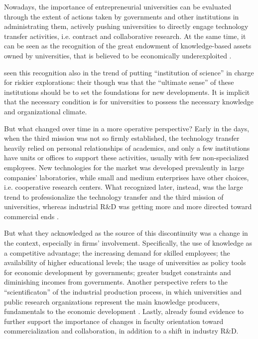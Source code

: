 Nowadays, the importance of entrepreneurial universities can be evaluated through the extent of actions taken by governments and other institutions in administrating them, actively pushing universities to directly engage technology transfer activities, i.e. contract and collaborative research. At the same time, it can be seen as the recognition of the great endowment of knowledge-based assets owned by universities, that is believed to be economically underexploited \citep{Tijssen2006}. 

\citet{Balconi2006} seen this recognition also in the trend of putting \enquote{institution of science} in charge for riskier explorations: their though was that the \enquote{ultimate sense} of these institutions should be to set the foundations for new developments. It is implicit that the necessary condition is for universities to possess the necessary knowledge and organizational climate.

But what changed over time in a more operative perspective? Early in the days, when the third mission was not so firmly established, the technology transfer heavily relied on personal relationships of academics, and only a few institutions have units or offices to support these activities, usually with few non-specialized employees. New technologies for the market was developed prevalently in large companies' laboratories, while small and medium enterprises have other choices, i.e. cooperative research centers. What \citet{Geuna2009} recognized later, instead, was the large trend to professionalize the technology transfer and the third mission of universities, whereas industrial R\&D was getting more and more directed toward commercial ends \citep{Fritsch2007}.

But what they acknowledged as the source of this discontinuity was a change in the context, especially in firms' involvement. Specifically, the use of knowledge as a competitive advantage; the increasing demand for skilled employees; the availability of higher educational levels; the usage of universities as policy tools for economic development by governments; greater budget constraints and diminishing incomes from governments. Another perspective refers to the \enquote{scientificaton} of the industrial production process, in which universities and public research organizations represent the main knowledge producers, fundamentals to the economic development \citep{Balderi2007}. Lastly, already \citet{Thursby2002} found evidence to further support the importance of changes in faculty orientation toward commercialization and collaboration, in addition to a shift in industry R\&D.

